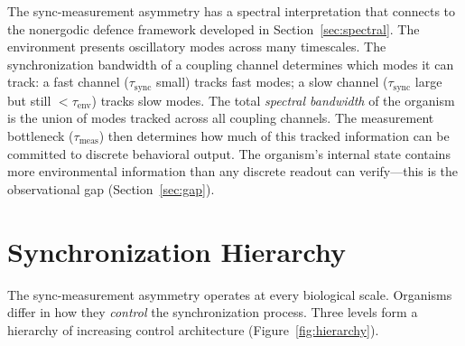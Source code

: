 \documentclass[12pt]{article}
\newcommand{\tsync}{\tau_{\mathrm{sync}}}
\newcommand{\tenv}{\tau_{\mathrm{env}}}
\newcommand{\tmeas}{\tau_{\mathrm{meas}}}
\begin{document}
The sync-measurement asymmetry has a spectral interpretation that connects to the nonergodic defence framework developed in Section~\ref{sec:spectral}. The environment presents oscillatory modes across many timescales. The synchronization bandwidth of a coupling channel determines which modes it can track: a fast channel ($\tsync$ small) tracks fast modes; a slow channel ($\tsync$ large but still $< \tenv$) tracks slow modes. The total \textit{spectral bandwidth} of the organism is the union of modes tracked across all coupling channels. The measurement bottleneck ($\tmeas$) then determines how much of this tracked information can be committed to discrete behavioral output. The organism's internal state contains more environmental information than any discrete readout can verify---this is the observational gap (Section~\ref{sec:gap}).


\section{Synchronization Hierarchy}
\label{sec:hierarchy}

The sync-measurement asymmetry operates at every biological scale. Organisms differ in how they \textit{control} the synchronization process. Three levels form a hierarchy of increasing control architecture (Figure~\ref{fig:hierarchy}).
\end{document}
